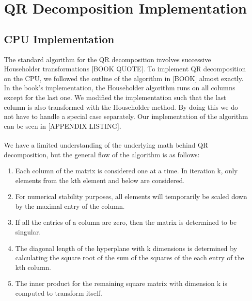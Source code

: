 \section{QR Decomposition Implementation}

\subsection{CPU Implementation}
The standard algorithm for the QR decomposition involves successive Householder transformations [BOOK QUOTE]. To implement QR decomposition on the CPU, we followed the outline of the algorithm in [BOOK] almost exactly. 
In the book's implementation, the Householder algorithm runs on all columns except for the last one. We modified the implementation such that the last column is also transformed with the Householder method. By doing this we do not have to handle a special case separately. 
Our implementation of the algorithm can be seen in [APPENDIX LISTING]. 
\\\\
We have a limited understanding of the underlying math behind QR decomposition, but the general flow of the algorithm is as follows:

\begin{enumerate}
    \item Each column of the matrix is considered one at a time. In iteration k, only elements from the kth element and below are considered. 
    \item For numerical stability purposes, all elements will temporarily be scaled down by the maximal entry of the column. 
    \item If all the entries of a column are zero, then the matrix is determined to be singular. 
    \item The diagonal length of the hyperplane with k dimensions is determined by calculating the square root of the sum of the squares of the each entry of the kth column. 
    \item The inner product for the remaining square matrix with dimension k is computed to transform itself. 

\end{enumerate}


